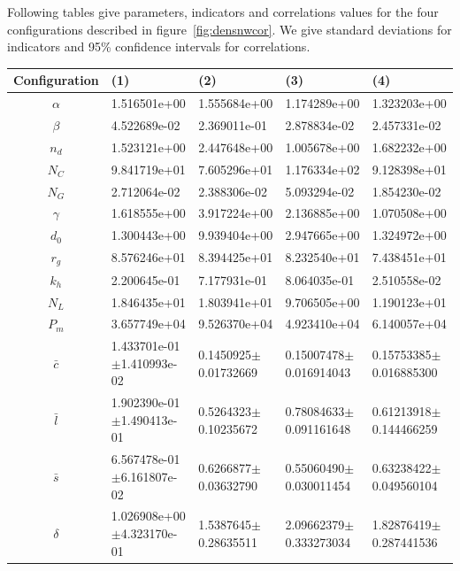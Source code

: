 Following tables give parameters, indicators and correlations values for the four configurations described in figure~\ref{fig:densnwcor}. We give standard deviations for indicators and 95\% confidence intervals for correlations.


\begin{center}

\begin{tabular}{|c|p{3.7cm}|p{3.7cm}|p{3.7cm}|p{3.7cm}|}
\hline
Configuration&(1)&(2)&(3)&(4)\\\hline
$\alpha$&1.516501e+00&1.555684e+00&1.174289e+00&1.323203e+00\\
$\beta$&4.522689e-02&2.369011e-01&2.878834e-02&2.457331e-02\\
$n_d$&1.523121e+00&2.447648e+00&1.005678e+00&1.682232e+00\\
$N_C$&9.841719e+01&7.605296e+01&1.176334e+02&9.128398e+01\\
$N_G$&2.712064e-02&2.388306e-02&5.093294e-02&1.854230e-02\\
$\gamma$&1.618555e+00&3.917224e+00&2.136885e+00&1.070508e+00\\
$d_0$&1.300443e+00&9.939404e+00&2.947665e+00&1.324972e+00\\
$r_g$&8.576246e+01&8.394425e+01&8.232540e+01&7.438451e+01\\
$k_h$&2.200645e-01&7.177931e-01&8.064035e-01&2.510558e-02\\
$N_L$&1.846435e+01&1.803941e+01&9.706505e+00&1.190123e+01\\
$P_m$&3.657749e+04&9.526370e+04&4.923410e+04&6.140057e+04\\\hline
$\bar{c}$&1.433701e-01$\pm$1.410993e-02&0.1450925$\pm$0.01732669&0.15007478$\pm$0.016914043&0.15753385$\pm$0.016885300\\
$\bar{l}$&1.902390e-01$\pm$1.490413e-01&0.5264323$\pm$0.10235672&0.78084633$\pm$0.091161648&0.61213918$\pm$0.144466259\\
$\bar{s}$&6.567478e-01$\pm$6.161807e-02&0.6266877$\pm$0.03632790&0.55060490$\pm$0.030011454&0.63238422$\pm$0.049560104\\
$\delta$&1.026908e+00$\pm$4.323170e-01&1.5387645$\pm$0.28635511&2.09662379$\pm$0.333273034&1.82876419$\pm$0.287441536\\

\end{tabular}
\end{center}
